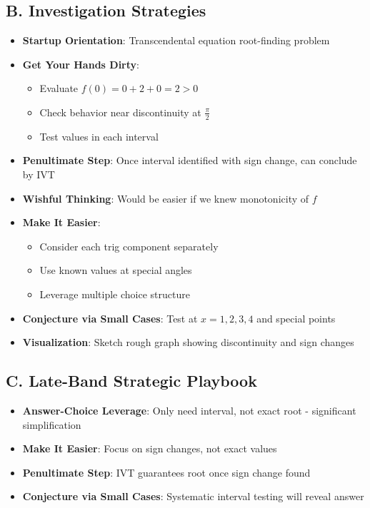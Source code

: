 \documentclass[]{article}
\begin{document}
\begin{strategicbox}
\subsection*{B. Investigation Strategies}
\begin{itemize}[leftmargin=*]
    \item \textbf{Startup Orientation}: Transcendental equation root-finding problem
    \item \textbf{Get Your Hands Dirty}: 
    \begin{itemize}
        \item Evaluate $f(0) = 0 + 2 + 0 = 2 > 0$
        \item Check behavior near discontinuity at $\frac{\pi}{2}$
        \item Test values in each interval
    \end{itemize}
    \item \textbf{Penultimate Step}: Once interval identified with sign change, can conclude by IVT
    \item \textbf{Wishful Thinking}: Would be easier if we knew monotonicity of $f$
    \item \textbf{Make It Easier}: 
    \begin{itemize}
        \item Consider each trig component separately
        \item Use known values at special angles
        \item Leverage multiple choice structure
    \end{itemize}
    \item \textbf{Conjecture via Small Cases}: Test at $x = 1, 2, 3, 4$ and special points
    \item \textbf{Visualization}: Sketch rough graph showing discontinuity and sign changes
\end{itemize}

\subsection*{C. Late-Band Strategic Playbook}
\begin{itemize}[leftmargin=*]
    \item \textbf{Answer-Choice Leverage}: Only need interval, not exact root - significant simplification
    \item \textbf{Make It Easier}: Focus on sign changes, not exact values
    \item \textbf{Penultimate Step}: IVT guarantees root once sign change found
    \item \textbf{Conjecture via Small Cases}: Systematic interval testing will reveal answer
\end{itemize}


\end{strategicbox}
\end{document}
